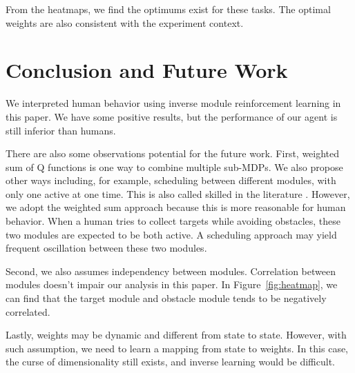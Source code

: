 \documentclass[11pt]{article} %
\begin{document}
From the heatmaps, we find the optimums exist for these tasks. The optimal
weights are also consistent with the experiment context.

\section{Conclusion and Future Work}
\label{sec:conclude}

We interpreted human behavior using inverse module reinforcement learning in
this paper. We have some positive results, but the performance of our agent is
still inferior than humans.

There are also some observations potential for the future work. First, 
weighted sum of Q functions is one way to combine multiple sub-MDPs. We also
propose other ways including, for example, scheduling between different modules,
with only one active at one time. This is also called skilled in the literature
\cite{konidaris2009skill}. However, we adopt the weighted sum approach
because this is more reasonable for human behavior. When a human tries to collect
targets while avoiding obstacles, these two modules are expected to be both
active. A scheduling approach may yield frequent oscillation between these two
modules.

Second, we also assumes independency between modules. Correlation between
modules doesn't impair our analysis in this paper. In Figure~\ref{fig:heatmap},
we can find that the target module and obstacle module tends to be negatively
correlated.

Lastly, weights may be dynamic and different from state to state. However, with
such assumption, we need to learn a mapping from state to weights. In this case,
the curse of dimensionality still exists, and inverse learning would be
difficult.



\end{document}
